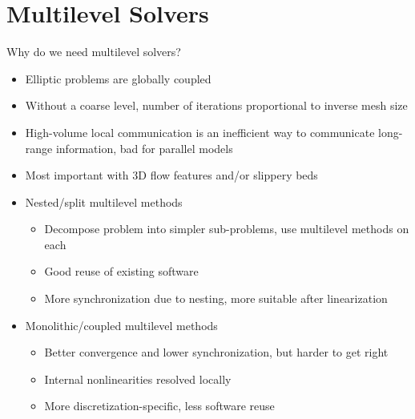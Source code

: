 \documentclass{beamer}
\begin{document}
\begin{frame}{}
  \begin{center}
    \color{red}{\Huge Joke}
  \end{center}
\end{frame}

\section{Multilevel Solvers}
\begin{frame}{Why do we need multilevel solvers?}
  \begin{itemize}
  \item Elliptic problems are globally coupled
  \item Without a coarse level, number of iterations proportional to inverse mesh size
  \item High-volume local communication is an inefficient way to communicate long-range information, bad for parallel models
  \item Most important with 3D flow features and/or slippery beds
  \item Nested/split multilevel methods
    \begin{itemize}
    \item Decompose problem into simpler sub-problems, use multilevel methods on each
    \item Good reuse of existing software
    \item More synchronization due to nesting, more suitable after linearization
    \end{itemize}
  \item Monolithic/coupled multilevel methods
    \begin{itemize}
    \item Better convergence and lower synchronization, but harder to get right
    \item Internal nonlinearities resolved locally
    \item More discretization-specific, less software reuse
    \end{itemize}
  \end{itemize}
\end{frame}

\end{document}
